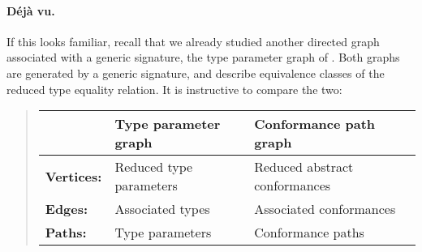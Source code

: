 \documentclass[../generics]{subfiles}
\begin{document}
\paragraph{D\'ej\`a vu.}
If this looks familiar, recall that we already studied another directed graph associated with a generic signature, the type parameter graph of . Both graphs are generated by a generic signature, and describe equivalence classes of the reduced type equality relation. It is instructive to compare the two:
\begin{quote}
\begin{tabular}{lll}
\toprule
&\textbf{Type parameter graph}&\textbf{Conformance path graph}\\
\midrule
\textbf{Vertices:}&Reduced type parameters&Reduced abstract conformances\\
\textbf{Edges:}&Associated types&Associated conformances\\
\textbf{Paths:}&Type parameters&Conformance paths\\
\bottomrule
\end{tabular}
\end{quote}
\end{document}
